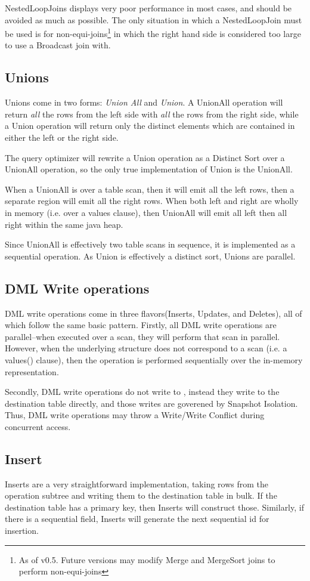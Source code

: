 NestedLoopJoins displays very poor performance in most cases, and should be avoided as much as possible. The only situation in which a NestedLoopJoin must be used is for non-equi-joins\footnote{As of v0.5. Future versions may modify Merge and MergeSort joins to perform non-equi-joins} in which the right hand side is considered too large to use a Broadcast join with.


\subsection{Unions}
Unions come in two forms: \emph{Union All} and \emph{Union}. A UnionAll operation will return \emph{all} the rows from the left side with \emph{all} the rows from the right side, while a Union operation will return only the distinct elements which are contained in either the left or the right side.

The query optimizer will rewrite a Union operation as a Distinct Sort over a UnionAll operation, so the only true implementation of Union is the UnionAll.

When a UnionAll is over a table scan, then it will emit all the left rows, then a separate region will emit all the right rows. When both left and right are wholly in memory (i.e. over a values clause), then UnionAll will emit all left then all right within the same java heap.

Since UnionAll is effectively two table scans in sequence, it is implemented as a sequential operation. As Union is effectively a distinct sort, Unions are parallel.

\subsection{DML Write operations}
DML write operations come in three flavors(Inserts, Updates, and Deletes), all of which follow the same basic pattern. Firstly, all DML write operations are parallel--when executed over a scan, they will perform that scan in parallel. However, when the underlying structure does not correspond to a scan (i.e. a values() clause), then the operation is performed sequentially over the in-memory representation.

Secondly, DML write operations do not write to \temp, instead they write to the destination table directly, and those writes are goverened by Snapshot Isolation. Thus, DML write operations may throw a Write/Write Conflict during concurrent access. 

\subsection{Insert}
Inserts are a very straightforward implementation, taking rows from the operation subtree and writing them to the destination table in bulk. If the destination table has a primary key, then Inserts will construct those. Similarly, if there is a sequential field, Inserts will generate the next sequential id for insertion.

